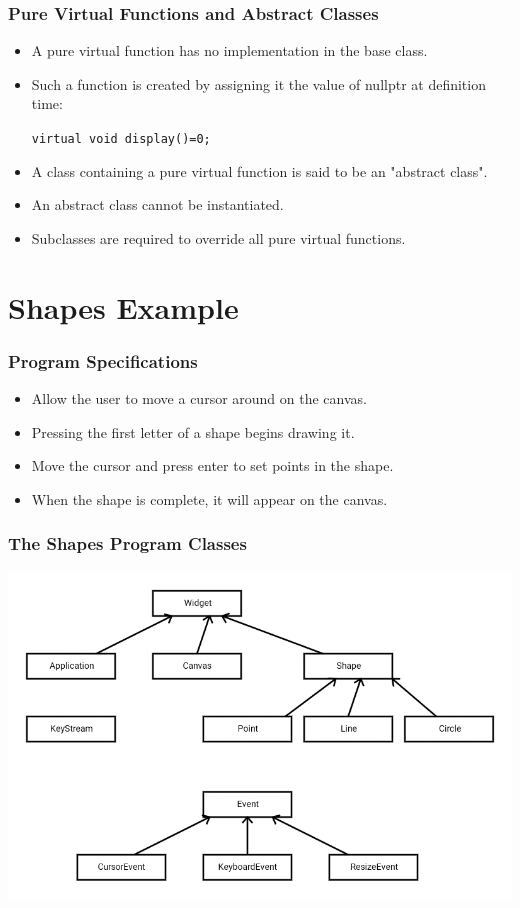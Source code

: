 \documentclass{beamer}
\begin{document}
\begin{frame}
    \frametitle{Pure Virtual Functions and Abstract Classes}
    \begin{itemize}
        \item<2-> A pure virtual function has no implementation in the base class.
        \item<3-> Such a function is created by assigning it the value of 
            nullptr at definition time:
            \par {\tt virtual void display()=0;}
        \item<4-> A class containing a pure virtual function is said to
            be an "abstract class".
        \item<5-> An abstract class cannot be instantiated. 
        \item<6-> Subclasses are required to override all pure virtual functions.
    \end{itemize}
\end{frame}

\section{Shapes Example}
\begin{frame}
    \frametitle{Program Specifications}
    \begin{itemize}
        \item Allow the user to move a cursor around on the canvas.
        \item Pressing the first letter of a shape begins drawing it.
        \item Move the cursor and press enter to set points in the shape.
        \item When the shape is complete, it will appear on the canvas.
    \end{itemize}
\end{frame}
\begin{frame}
    \frametitle{The Shapes Program Classes}
    \includegraphics[height=0.8\textheight]{images/shapes}
\end{frame}
\end{document}
